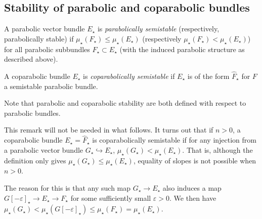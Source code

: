 \subsection{Stability of parabolic and coparabolic bundles}
\label{subsubsection:stability-parabolic}

\begin{definition}
\notready
	\label{definition:}
	A parabolic vector bundle $E_\star$ is {\em parabolically semistable}
	(respectively, parabolically stable) if $\mu_\star(F_\star) \leq
\mu_\star(E_\star)$ (respectively $\mu_\star(F_\star)< \mu_\star(E_\star)$) for all parabolic subbundles $F_\star \subset E_\star$ (with the
induced parabolic structure as described above).
\end{definition}
\begin{definition}
\notready
	\label{definition:coparabolic-stability}
	A coparabolic bundle $E_\star$ is {\em coparabolically semistable}
	if $E_\star$ is of the form $\widehat{F}_\star$ for $F$ a semistable
	parabolic bundle.
\end{definition}
\begin{remark}
\notready
	\label{remark:}
	Note that parabolic and coparabolic stability are both defined with
	respect to parabolic bundles.
\end{remark}
\begin{remark}
\notready
	\label{remark:coparabolic-stability}
	This remark will not be needed in what follows.
	It turns out that if $n > 0$,
	a coparabolic bundle $E_\star=\widehat{F}_\star$ is coparabolically semistable if for any
	injection from a parabolic vector bundle $G_\star \hookrightarrow E_\star$, $\mu_\star(G_\star) <
	\mu_\star(E_\star)$.
	That is, although the definition
	only gives $\mu_\star(G_\star) \leq \mu_\star(E_\star)$, equality of
	slopes is not possible when $n > 0$.

	The reason for this is that any such map $G_\star \to E_\star$ also
	induces a map $G[-\varepsilon]_\star \to E_\star\to F_\star$ for some sufficiently
	small $\varepsilon > 0$.
	We then have $\mu_\star(G_\star) < \mu_\star(G[-\varepsilon]_\star) \leq
	\mu_\star(F_\star)=\mu_\star(E_\star)$.
\end{remark}



